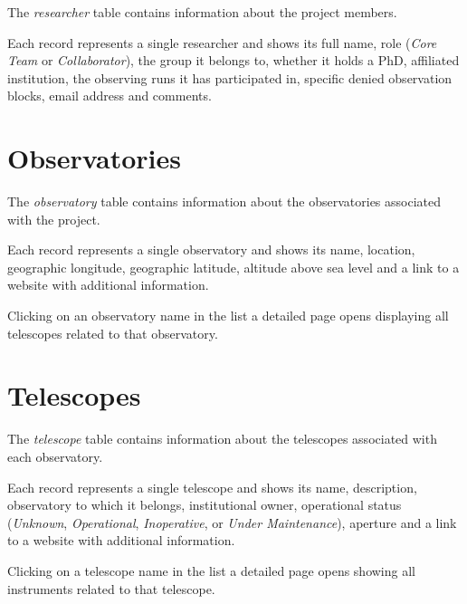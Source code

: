 The \textsl{researcher} table contains information about the project members. 

Each record represents a single researcher and shows its full name, role (\textsl{Core Team} or \textsl{Collaborator}), the group it belongs to, whether it holds a PhD, affiliated institution, the observing runs it has participated in, specific denied observation blocks, email address and comments.


\section{Observatories}

The \textsl{observatory} table contains information about the observatories associated with the project. 

Each record represents a single observatory and shows its name, location, geographic longitude, geographic latitude, altitude above sea level and a link to a website with additional information. 


Clicking on an observatory name in the list a detailed page opens displaying all telescopes related to that observatory.


\section{Telescopes}

The \textsl{telescope} table contains information about the telescopes associated with each observatory. 

Each record represents a single telescope and shows its name, description, observatory to which it belongs, institutional owner, operational status (\textsl{Unknown}, \textsl{Operational}, \textsl{Inoperative}, or \textsl{Under Maintenance}), aperture and a link to a website with additional information. 


Clicking on a telescope name in the list a detailed page opens showing all instruments related to that telescope.


